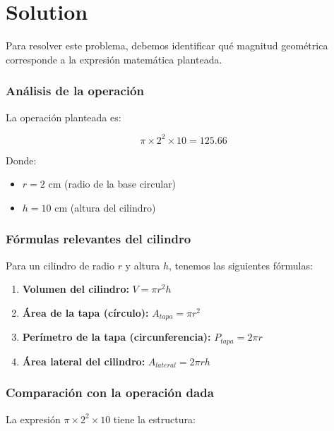 \documentclass[
]{article}
\providecommand{\tightlist}{%
  \setlength{\itemsep}{0pt}\setlength{\parskip}{0pt}}
\begin{document}
\section{Solution}\label{solution}

Para resolver este problema, debemos identificar qué magnitud geométrica
corresponde a la expresión matemática planteada.

\subsubsection{Análisis de la
operación}\label{anuxe1lisis-de-la-operaciuxf3n}

La operación planteada es:

\[\pi \times 2^2 \times 10 = 125.66\]

Donde:

\begin{itemize}
\tightlist
\item
  \(r = 2\) cm (radio de la base circular)
\item
  \(h = 10\) cm (altura del cilindro)
\end{itemize}

\subsubsection{Fórmulas relevantes del
cilindro}\label{fuxf3rmulas-relevantes-del-cilindro}

Para un cilindro de radio \(r\) y altura \(h\), tenemos las siguientes
fórmulas:

\begin{enumerate}
\def\labelenumi{\arabic{enumi}.}
\tightlist
\item
  \textbf{Volumen del cilindro:} \(V = \pi r^2 h\)
\item
  \textbf{Área de la tapa (círculo):} \(A_{tapa} = \pi r^2\)
\item
  \textbf{Perímetro de la tapa (circunferencia):} \(P_{tapa} = 2\pi r\)
\item
  \textbf{Área lateral del cilindro:} \(A_{lateral} = 2\pi r h\)
\end{enumerate}

\subsubsection{Comparación con la operación
dada}\label{comparaciuxf3n-con-la-operaciuxf3n-dada}

La expresión \(\pi \times 2^2 \times 10\) tiene la estructura:
\end{document}

